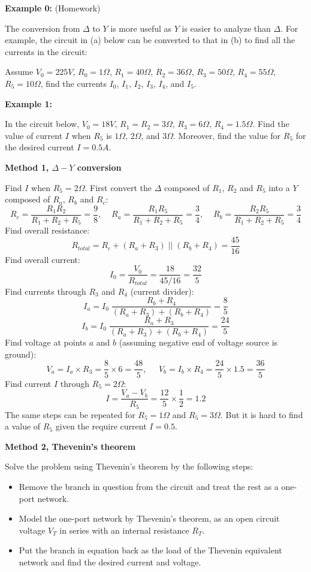 \begin{itemize}
{\bf Example 0:} (Homework)

The conversion from $\Delta$ to $Y$ is more useful as $Y$ is easier to
analyze than $\Delta$. For example, the circuit in (a) below can be 
converted to that in (b) to find all the currents in the circuit:


Assume $V_0=225 V$, $R_0=1\Omega$, $R_1=40\Omega$, $R_2=36\Omega$, 
$R_3=50\Omega$, $R_4=55\Omega$, $R_5=10\Omega$, find the currents 
$I_0$, $I_1$, $I_2$, $I_3$, $I_4$, and $I_5$. 

{\bf Example 1: } 

In the circuit below, $V_0=18V$, $R_1=R_2=3\Omega$, 
$R_3=6\Omega$, $R_4=1.5\Omega$. Find the value of current $I$ when $R_5$
is $1\Omega$, $2\Omega$, and $3\Omega$. Moreover, find the value for 
$R_5$ for the desired current $I=0.5A$.


{\bf Method 1, $\Delta-Y$ conversion}

Find $I$ when $R_5=2\Omega$. First convert the $\Delta$ composed of
$R_1$, $R_2$ and $R_5$ into a $Y$ composed of $R_a$, $R_b$ and $R_c$:
\[ 
R_c=\frac{R_1R_2}{R_1+R_2+R_5}=\frac{9}{8},\;\;\;\;
R_a=\frac{R_1R_5}{R_1+R_2+R_5}=\frac{3}{4},\;\;\;\;
R_b=\frac{R_2R_5}{R_1+R_2+R_5}=\frac{3}{4}
\]
Find overall resistance:
\[
R_{total}=R_c+(R_a+R_3) \;||\; (R_b+R_4)=\frac{45}{16}	
\]
Find overall current:
\[
I_0=\frac{V_0}{R_{total}}=\frac{18}{45/16}=\frac{32}{5}
\]
Find currents through $R_3$ and $R_4$ (current divider):
\[ 
I_a=I_0\;\frac{R_b+R_4}{(R_a+R_3)+(R_b+R_4)}=\frac{8}{5} 
\]
\[ 
I_b=I_0\;\frac{R_a+R_3}{(R_a+R_3)+(R_b+R_4)}=\frac{24}{5}
\]
Find voltage at points $a$ and $b$ (assuming negative end of voltage
source is ground):
\[
V_a=I_a \times R_3=\frac{8 }{5} \times 6=\frac{48}{5},\;\;\;\;\;
V_b=I_b \times R_4=\frac{24}{5} \times 1.5=\frac{36}{5}	
\]
Find current $I$ through $R_5=2\Omega$:
\[
I=\frac{V_a-V_b}{R_5}=\frac{12}{5}\times \frac{1}{2}=1.2
\]
The same steps can be repeated for $R_5=1\Omega$ and $R_5=3\Omega$. 
But it is hard to find a value of $R_5$ given the require current $I=0.5$.

{\bf Method 2, Thevenin's theorem}

Solve the problem using Thevenin's theorem by the following steps:
\begin{itemize}
\item Remove the branch in question from the circuit and treat the rest as
  a one-port network.
\item Model the one-port network by Thevenin's theorem, as an open circuit 
  voltage $V_T$ in series with an internal resistance $R_T$.
\item Put the branch in equation back as the load of the Thevenin equivalent
  network and find the desired current and voltage.
\end{itemize}


\end{itemize}
